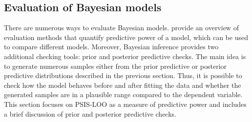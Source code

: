 \subsection{Evaluation of Bayesian models}

There are numerous ways to evaluate Bayesian models.
\cite{piironen_comparison_2017} provide an overview of evaluation methods that quantify predictive power of a model, which can be used to compare different models.
Moreover, Bayesian inference provides two additional checking tools: prior and posterior predictive checks.
The main idea is to generate numerous samples either from the prior predictive or posterior predictive distributions described in the previous section.
Thus, it is possible to check how the model behaves before and after fitting the data and whether the generated samples are in a plausible range compared to the dependent variable.
This section focuses on PSIS-LOO as a measure of predictive power and includes a brief discussion of prior and posterior predictive checks.

